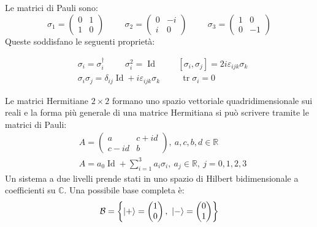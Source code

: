 \documentclass[11pt, a4paper]{scrartcl} %
\numberwithin{equation}{subsection}
\theoremstyle{style2}
\theoremstyle{style1}
\newenvironment{boxenv}[1][]{
    \begin{eqbox}[#1]
    }{
   \end{eqbox}
}
\begin{document}
Le matrici di Pauli sono:
\begin{equation}
	\sigma _1 = \begin{pmatrix} 0& 1 \\ 1& 0  \end{pmatrix} \hspace{1cm} \sigma _2 = \begin{pmatrix} 0& -i \\ i &0  \end{pmatrix} \hspace{1cm} \sigma _3 = \begin{pmatrix} 1 & 0  \\ 0 & -1  \end{pmatrix} 
\end{equation}
Queste soddisfano le seguenti propriet\`a:
\begin{boxenv}[]
	\begin{equation}
		\begin{split}
			&\sigma _i = \sigma _i ^\dagger \hspace{1cm} \sigma _i^2 = \operatorname{Id} \hspace{1cm} [\sigma _i, \sigma _j] =  2i \varepsilon _{ijk} \sigma _k\\
			&\sigma _i \sigma _j = \delta _{ij} \operatorname{Id} +  i \varepsilon _{ijk} \sigma _k \hspace{1cm} \operatorname{tr} \sigma _i = 0	
		\end{split}
	\end{equation}
\end{boxenv}
Le matrici Hermitiane $2\times 2$ formano uno spazio vettoriale quadridimensionale sui reali e la forma pi\`u generale di una matrice Hermitiana si pu\`o scrivere tramite le matrici di Pauli:
\begin{equation}\label{hmat}
	\begin{split}
		&A = \begin{pmatrix} a & c+id\\c-id& b \end{pmatrix}, \ a,c,b,d \in \mathbb{R}\\
		&A = a_0 \operatorname{Id} + \sum_{i=1}^{3} a_i \sigma _i, \ a_j \in \mathbb{R}, \ j=0,1,2,3
	\end{split}
\end{equation}
Un sistema a due livelli prende stati in uno spazio di Hilbert bidimensionale a coefficienti su $\mathbb{C}$. 
Una possibile base completa \`e:
\begin{equation}
	\mathcal{B} = \left\{ \ket{+ } =\begin{pmatrix} 1 \\ 0 \end{pmatrix} , \ \ket{-} = \begin{pmatrix} 0\\1 \end{pmatrix}  \right\} 
\end{equation}
\end{document}
